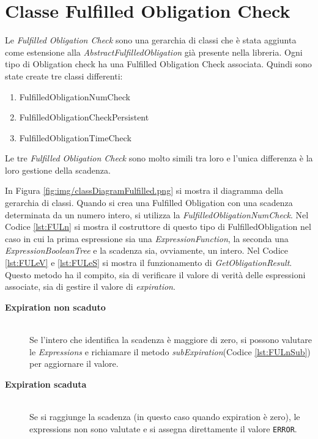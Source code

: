 \section{Classe Fulfilled Obligation Check}
\label{sec:FulfilledObligationCheck}
Le \emph{Fulfilled Obligation Check} sono una gerarchia di classi che è stata aggiunta
come estensione alla \emph{AbstractFulfilledObligation} già presente nella libreria.
Ogni tipo di Obligation check ha una Fulfilled Obligation Check associata. Quindi sono state create
tre classi differenti:
\begin{enumerate}
  \item FulfilledObligationNumCheck
  \item FulfilledObligationCheckPersistent
  \item FulfilledObligationTimeCheck
\end{enumerate}
Le tre \emph{Fulfilled Obligation Check} sono molto simili
tra loro e l'unica differenza è la loro gestione della scadenza.\par
In Figura \ref{fig:img/classDiagramFulfilled.png} si mostra il diagramma della gerarchia di classi.
Quando si crea una Fulfilled Obligation con una scadenza determinata da un numero intero, si utilizza
la \emph{FulfilledObligationNumCheck}. Nel Codice \ref{lst:FULn} si mostra il costruttore di questo tipo di
FulfilledObligation nel caso in cui la prima espressione sia una \emph{ExpressionFunction}, la seconda
una \emph{ExpressionBooleanTree} e la scadenza sia, ovviamente, un intero.
\clearpage
Nel Codice \ref{lst:FULeV} e \ref{lst:FULeS} si mostra il funzionamento di \emph{GetObligationResult}.
Questo metodo ha il compito, sia di verificare il valore di
verità delle espressioni associate, sia di gestire il valore di \emph{expiration}.
\begin{description}
  \item[\normalfont\bfseries{\MakeUppercase{E}xpiration non scaduto}]
  {
  \hfill \\
  Se l'intero che identifica la scadenza è maggiore di zero,
  si possono valutare le \emph{Expressions} e richiamare il metodo \emph{subExpiration}(Codice \ref{lst:FULnSub})
  per aggiornare il valore.
  }
  \item[\normalfont\bfseries{\MakeUppercase{E}xpiration scaduta}]
  {
  \hfill \\
  Se si raggiunge la scadenza (in questo caso quando expiration è zero), le expressions non sono valutate
  e si assegna direttamente il valore \texttt{ERROR}.
  }
\end{description}
